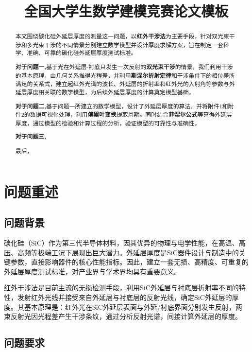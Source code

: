 \documentclass{cumcmthesis}
\title{全国大学生数学建模竞赛论文模板}  %
\begin{document}
\maketitle

\begin{abstract}
本文围绕碳化硅外延层厚度的测量这一问题，以\textbf{红外干涉法}为主要手段，针对双光束干涉和多光束干涉的不同情景分别建立数学模型并设计厚度求解方案，旨在制定一套科学、准确、可靠的碳化硅外延层厚度测试标准。


\textbf{对于问题一,}基于光在外延层-衬底只发生一次反射的\textbf{双光束干涉}的情景，我们利用干涉的基本原理，由几何关系推得光程差，并利用\textbf{斯涅尔折射定律}和干涉条件下的相位差所满足的关系式，建立起红外光谱的波长、外延层的折射率和红外光的入射角等参数与外延层厚度相关联的数学模型，为后续外延层厚度的计算奠定模型基础。

\textbf{对于问题二,}基于问题一所建立的数学模型，设计了外延层厚度的算法，并将附件1和附件2的数据可视化处理，利用\textbf{傅里叶变换}提取周期。同时结合\textbf{菲涅尔公式}等算得外延层厚度，通过模型的检验和计算过程的分析，验证模型的可靠性与准确性。

\textbf{对于问题三,}


最后，



\end{abstract}

\section{问题重述}
\subsection{问题背景}
碳化硅（SiC）作为第三代半导体材料，因其优异的物理与电学性能，在高温、高压、高频等极端工况下展现出巨大潜力。外延层厚度是SiC器件设计与制造中的关键参数，直接影响器件的核心性能指标。因此，建立一套无损、高精度、可重复的外延层厚度测试标准，对产业界与学术界均具有重要意义。

红外干涉法是目前主流的无损检测手段，利用SiC外延层与衬底层折射率不同的特性，发射红外光线并接受来自外延层与衬底层的反射光线，确定SiC外延层的厚度。其基本原理是：红外光在SiC外延层表面与外延/衬底界面分别发生反射，两束反射光因光程差产生干涉条纹，通过分析反射光谱，间接计算外延层的厚度。

\subsection{问题要求}
\end{document}
